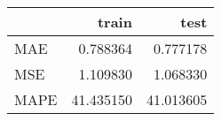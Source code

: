 \begin{tabular}{lrr}
\toprule
{} &      train &       test \\
\midrule
MAE  &   0.788364 &   0.777178 \\
MSE  &   1.109830 &   1.068330 \\
MAPE &  41.435150 &  41.013605 \\
\bottomrule
\end{tabular}
